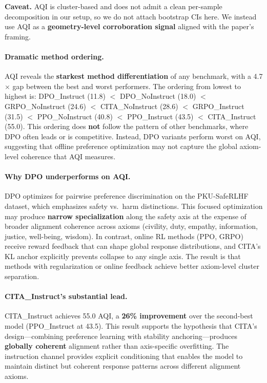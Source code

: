 \vspace{-0.2em}
\noindent\textbf{Caveat.}
AQI is cluster-based and does not admit a clean per-sample decomposition in our setup, so we do not attach bootstrap CIs here.
We instead use AQI as a \textbf{geometry-level corroboration signal} aligned with the paper's framing.

\paragraph{Dramatic method ordering.}
AQI reveals the \textbf{starkest method differentiation} of any benchmark, with a 4.7$\times$ gap between the best and worst performers.
The ordering from lowest to highest is: \textsc{DPO}\_Instruct (11.8) $<$ \textsc{DPO}\_NoInstruct (18.0) $<$ \textsc{GRPO}\_NoInstruct (24.6) $<$ \textsc{CITA}\_NoInstruct (28.6) $<$ \textsc{GRPO}\_Instruct (31.5) $<$ \textsc{PPO}\_NoInstruct (40.8) $<$ \textsc{PPO}\_Instruct (43.5) $<$ \textsc{CITA}\_Instruct (55.0).
This ordering does \textbf{not} follow the pattern of other benchmarks, where DPO often leads or is competitive.
Instead, DPO variants perform worst on AQI, suggesting that offline preference optimization may not capture the global axiom-level coherence that AQI measures.

\paragraph{Why DPO underperforms on AQI.}
DPO optimizes for pairwise preference discrimination on the PKU-SafeRLHF dataset, which emphasizes safety vs.\ harm distinctions.
This focused optimization may produce \textbf{narrow specialization} along the safety axis at the expense of broader alignment coherence across axioms (civility, duty, empathy, information, justice, well-being, wisdom).
In contrast, online RL methods (PPO, GRPO) receive reward feedback that can shape global response distributions, and \textsc{CITA}'s KL anchor explicitly prevents collapse to any single axis.
The result is that methods with regularization or online feedback achieve better axiom-level cluster separation.

\paragraph{\textsc{CITA}\_Instruct's substantial lead.}
\textsc{CITA}\_Instruct achieves 55.0 AQI, a \textbf{26\% improvement} over the second-best model (\textsc{PPO}\_Instruct at 43.5).
This result supports the hypothesis that \textsc{CITA}'s design---combining preference learning with stability anchoring---produces \textbf{globally coherent} alignment rather than axis-specific overfitting.
The instruction channel provides explicit conditioning that enables the model to maintain distinct but coherent response patterns across different alignment axioms.

